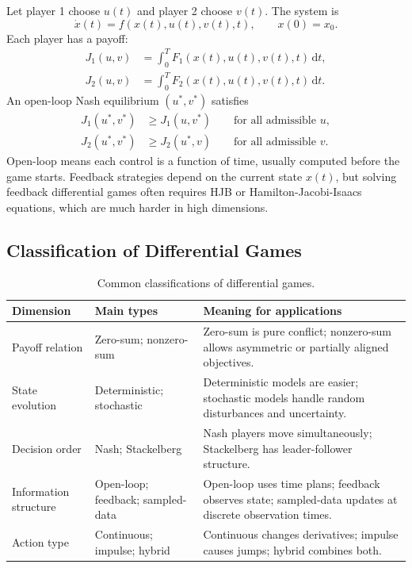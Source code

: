 \documentclass[11pt,a4paper]{article}
\newcommand{\dd}{\,\mathrm{d}}
\begin{document}
Let player 1 choose $u(t)$ and player 2 choose $v(t)$. The system is
\begin{equation}
  \dot{x}(t)=f(x(t),u(t),v(t),t),\qquad x(0)=x_0.
  \label{eq:dg-state}
\end{equation}
Each player has a payoff:
\begin{align}
  J_1(u,v)&=\int_0^T F_1(x(t),u(t),v(t),t)\dd t,\label{eq:j1}\\
  J_2(u,v)&=\int_0^T F_2(x(t),u(t),v(t),t)\dd t.\label{eq:j2}
\end{align}
An open-loop Nash equilibrium $(u^*,v^*)$ satisfies
\begin{align}
  J_1(u^*,v^*)&\geq J_1(u,v^*) \qquad \text{for all admissible }u,\label{eq:nash1}\\
  J_2(u^*,v^*)&\geq J_2(u^*,v) \qquad \text{for all admissible }v.\label{eq:nash2}
\end{align}
Open-loop means each control is a function of time, usually computed before the game starts. Feedback strategies depend on the current state $x(t)$, but solving feedback differential games often requires HJB or Hamilton-Jacobi-Isaacs equations, which are much harder in high dimensions.

\subsection{Classification of Differential Games}

\begin{table}[h!]
\centering
\caption{Common classifications of differential games.}
\begin{tabularx}{\textwidth}{L{3.0cm}L{3.2cm}Y}
\toprule
\textbf{Dimension} & \textbf{Main types} & \textbf{Meaning for applications} \\
\midrule
Payoff relation & Zero-sum; nonzero-sum & Zero-sum is pure conflict; nonzero-sum allows asymmetric or partially aligned objectives. \\
State evolution & Deterministic; stochastic & Deterministic models are easier; stochastic models handle random disturbances and uncertainty. \\
Decision order & Nash; Stackelberg & Nash players move simultaneously; Stackelberg has leader-follower structure. \\
Information structure & Open-loop; feedback; sampled-data & Open-loop uses time plans; feedback observes state; sampled-data updates at discrete observation times. \\
Action type & Continuous; impulse; hybrid & Continuous changes derivatives; impulse causes jumps; hybrid combines both. \\
\bottomrule
\end{tabularx}
\end{table}
\end{document}
